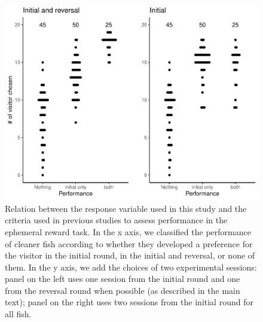 \documentclass[10pt,letterpaper]{article}
\begin{document}
\begin{figure}
\includegraphics[width=1\linewidth]{manuscript_PLOS_files/figure-latex/rawdata-1} \caption{Relation between the response variable used in this study and the criteria used in previous studies to assess performance in the ephemeral reward task. In the x axis, we classified the performance of cleaner fish according to whether they developed a preference for the visitor in the initial round, in the initial and reversal, or none of them. In the y axis, we add the choices of two experimental sessions: panel on the left uses one session from the initial round and one from the reversal round when possible (as described in the main text); panel on the right uses two sessions from the initial round for all fish.}\label{fig:rawdata}
\end{figure}
\end{document}
